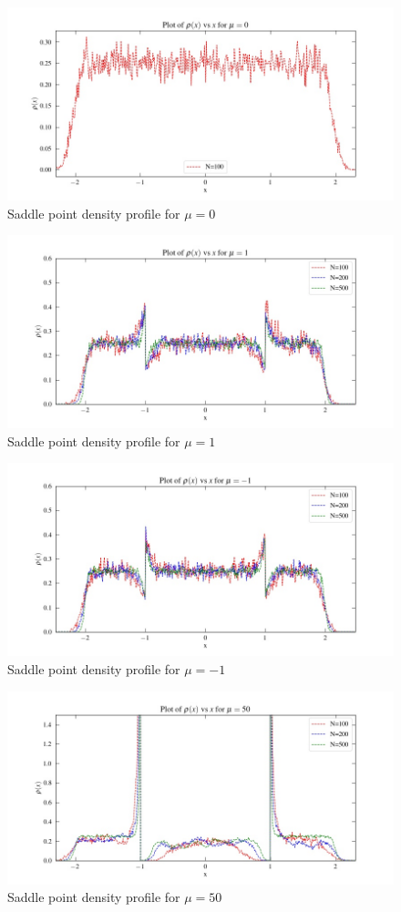 \documentclass[11pt]{article}
\begin{document}
\begin{figure}[H]
	\centering
	\includegraphics[width=0.8\columnwidth]{m00.jpg}
	\caption{Saddle point density profile for $\mu=0$}
	\label{fig:mu0}
\end{figure}
\begin{figure}[H]
	\centering
	\includegraphics[width=0.8\columnwidth]{m1.jpg}
	\caption{Saddle point density profile for $\mu=1$}
	\label{fig:mu1}
\end{figure}
\begin{figure}[H]
	\centering
	\includegraphics[width=0.8\columnwidth]{m-1.jpg}
	\caption{Saddle point density profile for $\mu=-1$}
	\label{fig:mu-1}
\end{figure}
\begin{figure}[H]
	\centering
	\includegraphics[width=0.8\columnwidth]{m50.jpg}
	\caption{Saddle point density profile for $\mu=50$}
	\label{fig:mu50}
\end{figure}
\end{document}
